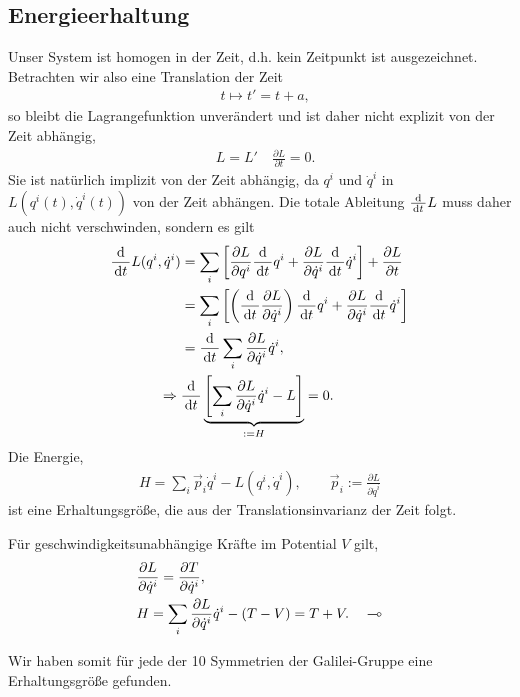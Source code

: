 \subsection{Energieerhaltung}
Unser System ist homogen in der Zeit, d.h. kein Zeitpunkt ist ausgezeichnet.
Betrachten wir also eine Translation der Zeit
\begin{align*}
&t\mapsto t' = t+a,
\end{align*}
so bleibt die Lagrangefunktion unverändert und ist daher nicht explizit von
der Zeit abhängig,
\begin{align*}
&L = L' \quad \frac{\partial L}{\partial t} = 0.
\end{align*}
Sie ist natürlich implizit von der Zeit abhängig, da $q^i$ und $\dot{q}^i$ in
$L(q^i(t),\dot{q}^i(t))$ von der Zeit abhängen. Die totale Ableitung
$\frac{\mathrm{d}}{\,\mathrm{d} t\,} L$ muss daher auch nicht verschwinden, sondern es gilt
\begin{align*}
\frac{\mathrm{d}}{\,\mathrm{d} t\,} L(q^{i},\dot{q}^i) &= \sum_i \left[\frac{\partial L}{\partial
q^{i}}\frac{\mathrm{d}}{\,\mathrm{d} t\,}q^{i} + \frac{\partial L}{\partial
\dot{q}^{i}}\frac{\mathrm{d}}{\,\mathrm{d} t\,}\dot{q}^{i} \right] + \frac{\partial L}{\partial
t}\\
&= \sum_i \left[\left(\frac{\mathrm{d}}{\,\mathrm{d} t\,}\frac{\partial
L}{\partial \dot{q}^i}\right)\frac{\mathrm{d}}{\,\mathrm{d} t\,}q^{i} + \frac{\partial
L}{\partial \dot{q}^{i}}\frac{\mathrm{d}}{\,\mathrm{d} t\,}\dot{q}^{i} \right]\\
&= \frac{\mathrm{d}}{\,\mathrm{d} t\,}\sum_i \frac{\partial L}{\partial\dot{q}^i}\dot{q}^i,\\
\Rightarrow\; & \frac{\mathrm{d}}{\,\mathrm{d} t\,}\underbrace{\left[\sum_i \frac{\partial
L}{\partial \dot{q}^i} \dot{q}^i - L\right]}_{:=H}=0.
\end{align*}
Die Energie,
\begin{align*}
H = \sum_i \vec{p}_i \dot{q}^i - L(q^i,\dot{q}^i),\qquad \vec{p}_i :=
\frac{\partial L}{\partial \dot{q}^i}
\end{align*}
ist eine Erhaltungsgröße, die aus der Translationsinvarianz der Zeit folgt.

\begin{bemn}
Für geschwindigkeitsunabhängige Kräfte im Potential $V$ gilt,
\begin{align*}
&\frac{\partial L}{\partial \dot{q}^i} = \frac{\partial T}{\partial
\dot{q}^i},\\
&H = \sum_i \frac{\partial L}{\partial \dot{q}^i}\dot{q}^i - (T-V)  =
T+V.\quad\multimap
\end{align*}
\end{bemn}

Wir haben somit für jede der 10 Symmetrien der Galilei-Gruppe eine
Erhaltungsgröße gefunden.
